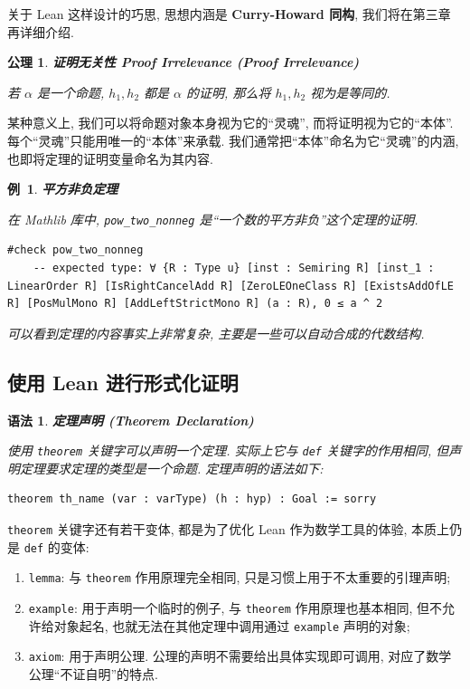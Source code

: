\documentclass[UTF8]{ctexart}
\DeclareMathOperator{\0}{\mathbf{0}}                    %
\newcommand{\<}{\langle}
\renewcommand{\>}{\rangle}                              %
\newenvironment{thm_box}{
    \begin{tcolorbox}[enhanced, colback=thm_blue2, boxrule=0pt, frame hidden,
        borderline west={0.7mm}{0.1mm}{thm_blue1},breakable]
    }
    {\end{tcolorbox}}
\newenvironment{xmp_box}{
    \begin{tcolorbox}[enhanced, colback=xmp_purple2, boxrule=0pt, frame hidden,
        borderline west={0.7mm}{0.1mm}{xmp_purple1},breakable]
    }
    {\end{tcolorbox}}
\newenvironment{axm_box}{
    \begin{tcolorbox}[enhanced, colback=axm_yellow2, boxrule=0pt, frame hidden,
        borderline west={0.7mm}{0.1mm}{axm_yellow1},breakable]
    }
    {\end{tcolorbox}}
\theoremstyle{MyStyle} %
\newtheorem{axiom}{公理}[section]
\newenvironment{axm}[2]
{
    \begin{axm_box}
        \begin{axiom}
            \textbf{#1
                \ifx\relax#2\relax\else %
                    (#2) %
                \fi}
            \newline
}
{
        \end{axiom}
    \end{axm_box}
}
\newtheorem{syntax}[definition]{语法}
\newenvironment{syn}[1]
{
    \begin{thm_box}
        \begin{syntax}
            \textbf{#1}
            \newline
}
{
        \end{syntax}
    \end{thm_box}
}
\newtheorem{example}{ 例\, }[subsection]
\newenvironment{xmp}[1]
{
    \begin{xmp_box}
        \begin{example}
            \textbf{#1}
            \newline
}
{
        \end{example}
    \end{xmp_box}
}
\newcommand*{\lean}[1]{\texttt{\color{blue}#1}}
\begin{document}
        关于 Lean 这样设计的巧思, 思想内涵是 \textbf{Curry-Howard 同构}, 我们将在第三章再详细介绍. 

        \begin{axm}
            {证明无关性}
            {Proof Irrelevance}
            若 $\alpha$ 是一个命题, $h_1,h_2$ 都是 $\alpha$ 的证明, 那么将 $h_1,h_2$ 视为是等同的. 
        \end{axm}

        某种意义上, 我们可以将命题对象本身视为它的``灵魂'', 而将证明视为它的``本体''. 每个``灵魂''只能用唯一的``本体''来承载. 我们通常把``本体''命名为它``灵魂''的内涵, 也即将定理的证明变量命名为其内容. 
        
        \begin{xmp}
            {平方非负定理}
            在 Mathlib 库中, \texttt{pow\_two\_nonneg} 是``一个数的平方非负''这个定理的证明. 
            \begin{lstlisting}[style=lean]
    #check pow_two_nonneg
    -- expected type: ∀ {R : Type u} [inst : Semiring R] [inst_1 : LinearOrder R] [IsRightCancelAdd R] [ZeroLEOneClass R] [ExistsAddOfLE R] [PosMulMono R] [AddLeftStrictMono R] (a : R), 0 ≤ a ^ 2
            \end{lstlisting}

            可以看到定理的内容事实上非常复杂, 主要是一些可以自动合成的代数结构. 
        \end{xmp}

    \subsection{使用 Lean 进行形式化证明}

        \begin{syn}
            {定理声明 (Theorem Declaration)}
            使用 \lean{theorem} 关键字可以声明一个定理. 实际上它与 \lean{def} 关键字的作用相同, 但声明定理要求定理的类型是一个命题. 定理声明的语法如下:
            \begin{lstlisting}[style=lean]
    theorem th_name (var : varType) (h : hyp) : Goal := sorry
            \end{lstlisting}
        \end{syn}

        \lean{theorem} 关键字还有若干变体, 都是为了优化 Lean 作为数学工具的体验, 本质上仍是 \lean{def} 的变体: 
        \begin{enumerate}
            \item \lean{lemma}: 与 \lean{theorem} 作用原理完全相同, 只是习惯上用于不太重要的引理声明; 
            
            \item \lean{example}: 用于声明一个临时的例子, 与 \lean{theorem} 作用原理也基本相同, 但不允许给对象起名, 也就无法在其他定理中调用通过 \lean{example} 声明的对象; 
            
            \item \lean{axiom}: 用于声明公理. 公理的声明不需要给出具体实现即可调用, 对应了数学公理``不证自明''的特点. 
        \end{enumerate}
\end{document}
